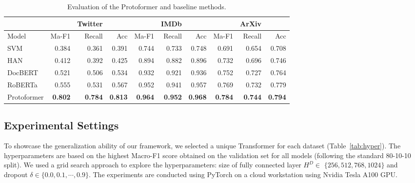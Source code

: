 \documentclass[letterpaper]{article} \usepackage{aaai22}  \usepackage{times}  \usepackage{helvet}  \usepackage{courier}  \usepackage{amsmath,amssymb}
\begin{document}
\begin{table}[!t]
 \centering
\caption{Evaluation of the Protoformer and baseline methods. }

\begin{tabular}{l|rrr|rrr|rrr}

\hline
\hline
 & & Twitter & & & IMDb & & & ArXiv & \\
\hline
Model & Ma-F1 & Recall & Acc & Ma-F1 & Recall & Acc & Ma-F1 & Recall & Acc\\
 \hline SVM~\cite{svm2003} & 0.384 & 0.361 & 0.391 & 0.744 & 0.733 & 0.748 & 0.691 & 0.654 & 0.708 \\
HAN~\cite{yang2016hierarchical} & 0.412 & 0.392 & 0.425 & 0.894 &0.882 & 0.896 & 0.732 & 0.696 & 0.746 \\
DocBERT~\cite{adhikari2019docbert} & 0.521 & 0.506 & 0.534 & 0.932&0.921&0.936 &0.752&0.727&0.764 \\
RoBERTa~\cite{liu2019roberta} & 0.555 & 0.531& 0.567 & 0.952 &0.941 & 0.957 &0.769&0.732&0.779\\
Protoformer & \textbf{0.802} & \textbf{0.784}& \textbf{0.813} & \textbf{0.964} &\textbf{0.952}&\textbf{0.968} & \textbf{0.784} & \textbf{0.744} & \textbf{0.794}\\
\hline
\hline
\end{tabular}

\label{tab:results}
\end{table}

\subsection{Experimental Settings}
To showcase the generalization ability of our framework, we selected a unique Transformer for each dataset (Table~\ref{tab:hyper}).
The hyperparameters are based on the highest Macro-F1 score obtained on the validation set for all models (following the standard 80-10-10 split). We used a grid search approach to explore the hyperparameters: size of fully connected layer ${H}^{D} \in$ $\{256,512,768,1024\}$ and dropout $\delta \in\{0.0,0.1, \cdots, 0.9\}$. 
The experiments are conducted using PyTorch on a cloud workstation using Nvidia Tesla A100 GPU.
\end{document}

